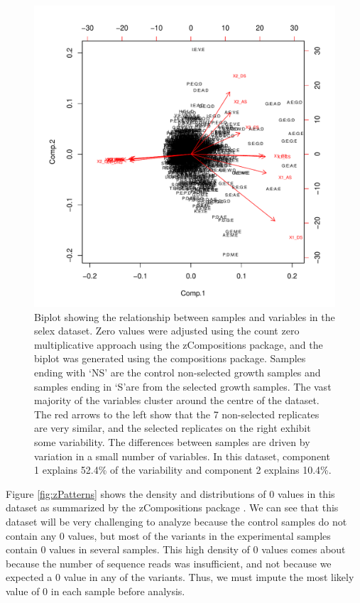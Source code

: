 \documentclass[article]{ajs}\usepackage[]{graphicx}\usepackage[]{color}
\begin{document}
\begin{figure}[!ht]
\centerline{\includegraphics[width=5in]{figs/biplot_CZM.pdf}}
\vspace{3mm} \caption{Biplot showing the relationship between samples and variables in the selex dataset. Zero values were adjusted using the count zero multiplicative approach using the zCompositions  package, and the biplot was generated using the compositions  package. Samples ending with `NS' are the control non-selected growth samples and samples ending in `S'are from the selected growth samples.  The vast majority  of the variables cluster around the centre of the dataset. The red arrows to the left show that the 7 non-selected replicates are very similar, and the selected replicates on the right exhibit some variability. The differences between samples are driven by variation in a small number of variables.  In this dataset, component 1 explains 52.4\% of the variability and component 2 explains 10.4\%.}
\label{fig:biplot}
\end{figure}

Figure \ref{fig:zPatterns} shows the density and distributions of 0 values in this dataset as summarized by the zCompositions  package \citep{PalareaAlbaladejo201585}.  We can see that this dataset will be very challenging to analyze because the control samples do not contain any 0 values, but most of the variants in the experimental samples contain 0 values in several samples. This high density of 0 values comes about because the number of sequence reads was insufficient, and not because we expected a 0 value in any of the variants. Thus, we must impute the most likely value of 0 in each sample before analysis. 
\end{document}
